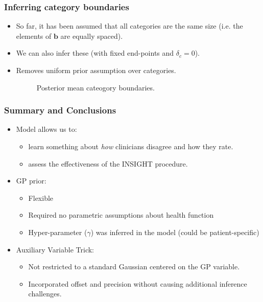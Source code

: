 \begin{frame}
	\frametitle{Inferring category boundaries}
	\begin{itemize}
		\item So far, it has been assumed that all categories are the same size (i.e. the elements of $\mathbf{b}$ are equally spaced).
		\item We can also infer these (with fixed end-points and $\delta_c=0$).
		\item Removes uniform prior assumption over categories.
	\begin{figure}[tbh]
		\hfill
		\centering\caption{\label{fig:clinicalcategories}Posterior mean cateogory boundaries.}
	\end{figure}
	\end{itemize}
\end{frame}

\begin{frame}
	\frametitle{Summary and Conclusions}
	\begin{itemize}
		\item Model allows us to:
		\begin{itemize}
			\item learn something about \emph{how} clinicians disagree and how they rate.
			\item assess the effectiveness of the INSIGHT procedure.
		\end{itemize}
		\item<2-> GP prior:
		\begin{itemize}
			\item Flexible
			\item Required no parametric assumptions about health function
			\item Hyper-parameter ($\gamma$) was inferred in the model (could be patient-specific)
		\end{itemize}
		\item<3-> Auxiliary Variable Trick:
		\begin{itemize}
			\item Not restricted to a standard Gaussian centered on the GP variable.
			\item Incorporated offset and precision without causing additional inference challenges.
		\end{itemize}
	\end{itemize}
\end{frame}